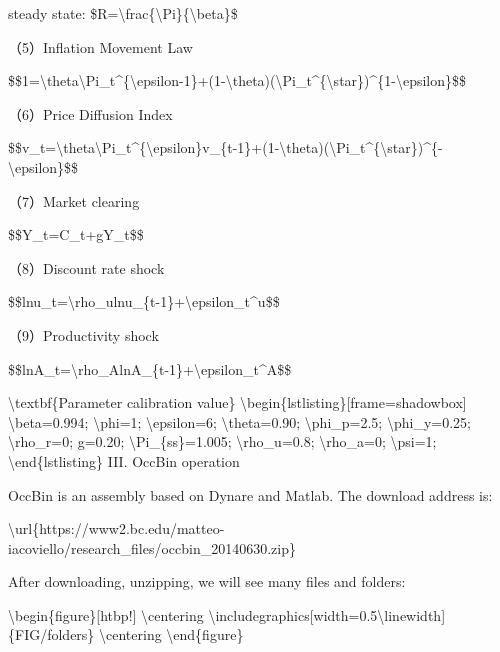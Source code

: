 \documentclass[10pt,math=newtx,citestyle=gb7714-2015,bibstyle=gb7714-2015]{elegantbook}
\begin{document}
	steady state: \$R=\textbackslash{}frac\{\textbackslash{}Pi\}\{\textbackslash{}beta\}\$
	
	（5）Inflation Movement Law
	
	\$\$1=\textbackslash{}theta\textbackslash{}Pi\_t\^{}\{\textbackslash{}epsilon-1\}+(1-\textbackslash{}theta)(\textbackslash{}Pi\_t\^{}\{\textbackslash{}star\})\^{}\{1-\textbackslash{}epsilon\}\$\$
	
	（6）Price Diffusion Index
	
	\$\$v\_t=\textbackslash{}theta\textbackslash{}Pi\_t\^{}\{\textbackslash{}epsilon\}v\_\{t-1\}+(1-\textbackslash{}theta)(\textbackslash{}Pi\_t\^{}\{\textbackslash{}star\})\^{}\{-\textbackslash{}epsilon\}\$\$
	
	（7）Market clearing
	
	\$\$Y\_t=C\_t+gY\_t\$\$
	
	
	（8）Discount rate shock
	
	\$\$lnu\_t=\textbackslash{}rho\_ulnu\_\{t-1\}+\textbackslash{}epsilon\_t\^{}u\$\$
	
	（9）Productivity shock
	
	\$\$lnA\_t=\textbackslash{}rho\_AlnA\_\{t-1\}+\textbackslash{}epsilon\_t\^{}A\$\$
	
	
	\textbackslash{}textbf\{Parameter calibration value\}
	\textbackslash{}begin\{lstlisting\}[frame=shadowbox]
	\textbackslash{}beta=0.994;
	\textbackslash{}phi=1;
	\textbackslash{}epsilon=6;
	\textbackslash{}theta=0.90;
	\textbackslash{}phi\_p=2.5;
	\textbackslash{}phi\_y=0.25;
	\textbackslash{}rho\_r=0;
	g=0.20;
	\textbackslash{}Pi\_\{ss\}=1.005;
	\textbackslash{}rho\_u=0.8;
	\textbackslash{}rho\_a=0;
	\textbackslash{}psi=1;
	\textbackslash{}end\{lstlisting\}
	III. OccBin operation
	
	OccBin is an assembly based on Dynare and Matlab. The download address is:
	
	\textbackslash{}url\{https://www2.bc.edu/matteo-iacoviello/research\_files/occbin\_20140630.zip\}
	
	After downloading, unzipping, we will see many files and folders:
	
	\textbackslash{}begin\{figure\}[htbp!]
	\textbackslash{}centering
	\textbackslash{}includegraphics[width=0.5\textbackslash{}linewidth]\{FIG/folders\}
	\textbackslash{}centering
	\textbackslash{}end\{figure\}
	
\end{document}
